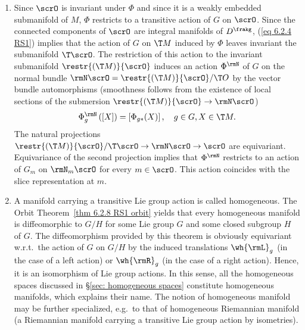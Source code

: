 \begin{rem}[{{\cite[Rem.~6.2.10]{RS1}}}]
\begin{enumerate}
        On the other hand, the isotropy representation restricted to $\T_m\scrO$ can be brought to the following normal form. By the Orbit Theorem~\ref{thm 6.2.8 RS1 orbit}, the map $\Phi^m_{\ast e}:\frakg\to \T_mM$ has image $\T_m\scrO$. By point 3 of Proposition~\ref{prop 6.2.2 RS1} it has kernel $\frakg_m$. Hence, this mapping induces a natural vector space isomorphism
        \[\T_m\scrO\cong \frakg\slash\frakg_m.\]
        In view of (\ref{eq 6.2.1 RS1}), this implies that this isomorphism intertwines the representation of $G_m$ on $\frakg\slash\frakg_m$ induced by the adjoint representation with the isotropy representation on $\T_m\scrO$.
        \item Since $\scrO$ is invariant under $\Phi$ and since it is a weakly embedded submanifold of $M$, $\Phi$ restricts to a transitive action of $G$ on $\scrO$. Since the connected components of $\scrO$ are integral manifolds of $D^\frakg$, (\ref{eq 6.2.4 RS1}) implies that the action of $G$ on $\T M$ induced by $\Phi$ leaves invariant the submanifold $\T \scrO$. The restriction of this action to the invariant submanifold $\restr{(\T M)}{\scrO}$ induces an action $\Phi^\rmN$ of $G$ on the normal bundle $\rmN \scrO=\restr{(\T M)}{\scrO}\slash \T O$ by the vector bundle automorphisms (smoothness follows from the existence of local sections of the submersion $\restr{(\T M)}{\scrO}\to \rmN \scrO$)
        \[\Phi_g^\rmN\left([X]\right)=\left[\Phi_{g\ast}(X)\right],\quad g\in G,X\in \T M.\]
        The natural projections $\restr{(\T M)}{\scrO}\slash \T \scrO\to \rmN \scrO\to \scrO$ are equivariant. Equivariance of the second projection implies that $\Phi^\rmN$ restricts to an action of $G_m$ on $\rmN_m\scrO$ for every $m\in \scrO$. This action coincides with the slice representation at $m$.
        \item A manifold carrying a transitive Lie group action is called homogeneous. The Orbit Theorem~\ref{thm 6.2.8 RS1 orbit} yields that every homogeneous manifold is diffeomorphic to $G\slash H$ for some Lie group $G$ and some closed subgroup $H$ of $G$. The diffeomorphism provided by this theorem is obviously equivariant w.r.t.\ the action of $G$ on $G\slash H$ by the induced translations $\wh{\rmL}_g$ (in the case of a left action) or $\wh{\rmR}_g$ (in the case of a right action). Hence, it is an isomorphism of Lie group actions. In this sense, all the homogeneous spaces discussed in \S\ref{sec: homogeneous spaces} constitute homogeneous manifolds, which explains their name. The notion of homogeneous manifold may be further specialized, e.g.~to that of homogeneous Riemannian manifold (a Riemannian manifold carrying a transitive Lie group action by isometries).
    \end{enumerate}
\end{rem}


